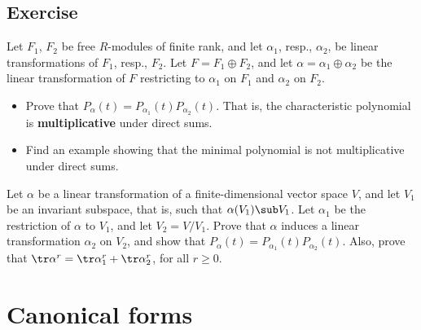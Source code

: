 \subsection{Exercise}
\begin{exercise}\label{Chara poly dire sum}
Let $F_1$, $F_2$ be free $R$-modules of finite rank, and let $\alpha_1$, resp., $\alpha_2$, be linear transformations of $F_1$, resp., $F_2$. Let $F=F_1\oplus F_2$, and let $\alpha=\alpha_1\oplus\alpha_2$ be the linear transformation of $F$ restricting to $\alpha_1$ on $F_1$ and $\alpha_2$ on $F_2$.
\begin{itemize}
\item Prove that $P_\alpha(t)=P_{\alpha_1}(t)P_{\alpha_2}(t)$. That is, the characteristic polynomial is \textbf{multiplicative} under direct sums.
\item Find an example showing that the minimal polynomial is not multiplicative under direct sums.
\end{itemize}
\end{exercise}
\begin{exercise}
Let $\alpha$ be a linear transformation of a finite-dimensional vector space $V$, and let $V_1$ be an invariant subspace, that is, such that $\alpha(V_1)\sub V_1$. Let $\alpha_1$ be the restriction of $\alpha$ to $V_1$, and let $V_2=V/V_1$. Prove that $\alpha$ induces a linear transformation $\alpha_2$ on $V_2$, and show that $P_\alpha(t)=P_{\alpha_1}(t)P_{\alpha_2}(t)$. Also, prove that $\tr\alpha^r=\tr\alpha^{r}_1+\tr\alpha^{r}_2$, for all $r\geq 0$.
\end{exercise}
\section{Canonical forms}
